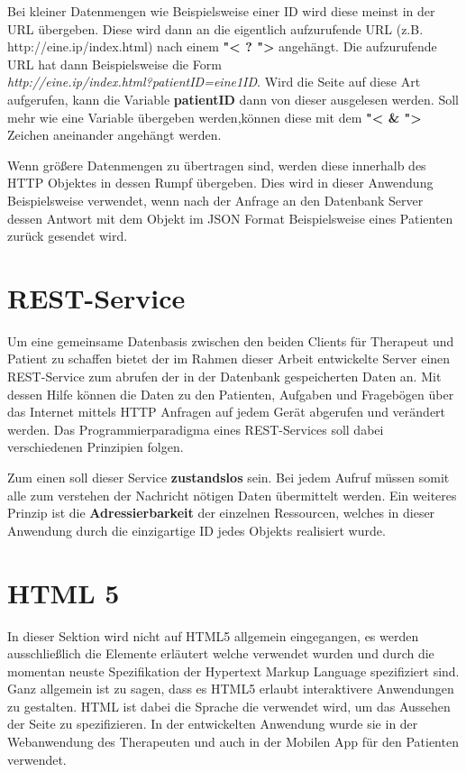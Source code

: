 Bei kleiner Datenmengen wie Beispielsweise einer ID wird diese meinst in der URL übergeben. Diese wird dann an die eigentlich aufzurufende URL (z.B. http://eine.ip/index.html) nach einem \textbf{"< ? ">} angehängt.
Die aufzurufende URL hat dann Beispielsweise die Form \\ \textit{http://eine.ip/index.html?patientID=eine1ID}.
Wird die Seite auf diese Art aufgerufen, kann die Variable \textbf{patientID} dann von dieser ausgelesen werden. Soll mehr wie eine Variable übergeben werden,können diese mit dem \textbf{"< \& ">} Zeichen aneinander angehängt werden.

Wenn größere Datenmengen zu übertragen sind, werden diese innerhalb des HTTP Objektes in dessen Rumpf übergeben. Dies wird in dieser Anwendung Beispielsweise verwendet, wenn nach der Anfrage an den Datenbank Server dessen Antwort mit dem Objekt im JSON Format Beispielsweise eines Patienten zurück gesendet wird.

\section{REST-Service}
Um eine gemeinsame Datenbasis zwischen den beiden Clients für Therapeut und Patient zu schaffen bietet der im Rahmen dieser Arbeit entwickelte Server einen REST-Service zum abrufen der in der Datenbank gespeicherten Daten an. Mit dessen Hilfe können die Daten zu den Patienten, Aufgaben und Fragebögen über das Internet mittels HTTP Anfragen auf jedem Gerät abgerufen und verändert werden. Das Programmierparadigma eines REST-Services soll dabei verschiedenen Prinzipien folgen.

Zum einen soll dieser Service \textbf{zustandslos} sein. Bei jedem Aufruf müssen somit alle zum verstehen der Nachricht nötigen Daten übermittelt werden.
Ein weiteres Prinzip ist die \textbf{Adressierbarkeit} der einzelnen Ressourcen, welches in dieser Anwendung durch die einzigartige ID jedes Objekts realisiert wurde.

\section{HTML 5}
In dieser Sektion wird nicht auf HTML5 allgemein eingegangen, es werden ausschließlich die Elemente erläutert welche verwendet wurden und durch die momentan neuste Spezifikation der Hypertext Markup Language spezifiziert sind. Ganz allgemein ist zu sagen, dass es HTML5 erlaubt interaktivere Anwendungen zu gestalten. HTML ist dabei die Sprache die verwendet wird, um das Aussehen der Seite zu spezifizieren. In der entwickelten Anwendung wurde sie in der Webanwendung des Therapeuten und auch in der Mobilen App für den Patienten verwendet.

